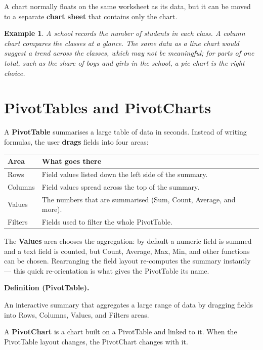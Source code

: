 \documentclass[11pt]{article}
\newtheorem{example}{Example}[section]
\newenvironment{definitionbox}[1]{%
  \par\noindent\textbf{Definition (#1).}\ \itshape
}{\par\vspace{0.3em}}
\begin{document}
A chart normally floats on the same worksheet as its data, but it can be moved
to a separate \textbf{chart sheet} that contains only the chart.

\begin{example}
A school records the number of students in each class. A column chart compares
the classes at a glance. The same data as a line chart would suggest a trend
across the classes, which may not be meaningful; for parts of one total, such as
the share of boys and girls in the school, a pie chart is the right choice.
\end{example}

\section{PivotTables and PivotCharts}
A \textbf{PivotTable} summarises a large table of data in seconds. Instead of
writing formulas, the user \textbf{drags} fields into four areas:

\begin{center}
\begin{tabular}{p{}p{}}
\toprule
\textbf{Area} & \textbf{What goes there} \\
\midrule
Rows & Field values listed down the left side of the summary. \\
Columns & Field values spread across the top of the summary. \\
Values & The numbers that are summarised (Sum, Count, Average, and more). \\
Filters & Fields used to filter the whole PivotTable. \\
\bottomrule
\end{tabular}
\end{center}

The \textbf{Values} area chooses the aggregation: by default a numeric field is
summed and a text field is counted, but Count, Average, Max, Min, and other
functions can be chosen. Rearranging the field layout re-computes the summary
instantly --- this quick re-orientation is what gives the PivotTable its name.

\begin{definitionbox}{PivotTable}
An interactive summary that aggregates a large range of data by dragging fields
into Rows, Columns, Values, and Filters areas.
\end{definitionbox}

A \textbf{PivotChart} is a chart built on a PivotTable and linked to it. When
the PivotTable layout changes, the PivotChart changes with it.
\end{document}
